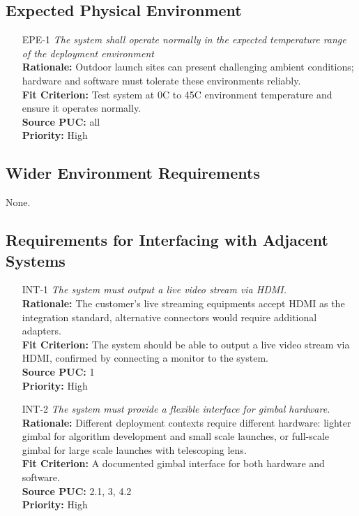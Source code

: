 \documentclass[12pt]{article}
\begin{document}
\subsection{Expected Physical Environment}
\begin{itemize}[leftmargin=*]
  \item[EPE-1] \emph{The system shall operate normally in the expected temperature
          range of the deployment environment}\\[2mm]
        \textbf{Rationale:} Outdoor launch sites can present challenging ambient conditions; hardware and software must tolerate these environments reliably.\\
        \textbf{Fit Criterion:} Test system at 0C to 45C environment temperature and ensure it operates normally.\\
        \textbf{Source PUC:} all \\
        \textbf{Priority:} High
\end{itemize}

\subsection{Wider Environment Requirements}

None.

\subsection{Requirements for Interfacing with Adjacent Systems}

\begin{itemize}[leftmargin=*]
  \item[INT-1] \emph{The system must output a live video stream via HDMI.}\\[2mm]
        \textbf{Rationale:} The customer's live streaming equipments accept HDMI as the integration standard, alternative connectors would require additional adapters.\\
        \textbf{Fit Criterion:} The system should be able to output a live video stream via HDMI, confirmed by connecting a monitor to the system.\\
        \textbf{Source PUC:} 1 \\
        \textbf{Priority:} High

  \item[INT-2] \emph{The system must provide a flexible interface for gimbal
          hardware.}\\[2mm]
        \textbf{Rationale:} Different deployment contexts require different hardware: lighter gimbal for algorithm development and small scale launches, or full-scale gimbal for large scale launches with telescoping lens.\\
        \textbf{Fit Criterion:} A documented gimbal interface for both hardware and software.\\
        \textbf{Source PUC:} 2.1, 3, 4.2 \\
        \textbf{Priority:} High
\end{itemize}
\end{document}
